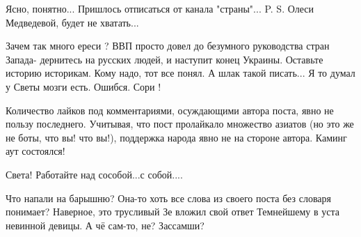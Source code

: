 \begin{itemize}
 
Ясно, понятно... Пришлось отписаться от канала "страны"... P. S. Олеси Медведевой, будет не хватать...

 
Зачем так много ереси ? ВВП просто довел до безумного руководства стран Запада- дернитесь на русских людей, и наступит конец Украины. Оставьте историю историкам. Кому надо, тот все понял. А шлак такой писать... Я то думал у Светы мозги есть. Ошибся. Сори !

 
Количество лайков под комментариями, осуждающими автора поста, явно не пользу последнего. Учитывая, что пост пролайкало множество азиатов (но это же не боты, что вы! что вы!), поддержка народа явно не на стороне автора. Каминг аут состоялся!

 
Света! Работайте над сособой...с собой....🤪



 
Что напали на барышню? Она-то хоть все слова из своего поста без словаря
понимает? Наверное, это трусливый Зе вложил свой ответ Темнейшему в уста
невинной девицы. А чё сам-то, не? Зассамши? \Laughey[1.0][white]

 

\end{itemize}
